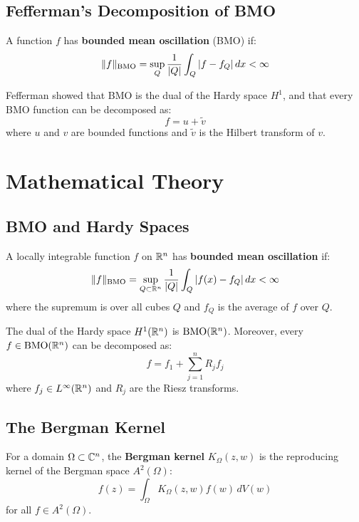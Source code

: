 \subsection{Fefferman's Decomposition of BMO}

A function $f$ has \textbf{bounded mean oscillation} (BMO) if:
\[
\|f\|_{\operatorname{BMO}} = \sup_Q \frac{1}{|Q|} \int_Q |f - f_Q| \, dx < \infty
\]

Fefferman showed that BMO is the dual of the Hardy space $H^1$, and that every BMO function can be decomposed as:
\[
f = u + \widetilde{v}
\]
where $u$ and $v$ are bounded functions and $\widetilde{v}$ is the Hilbert transform of $v$.

\section{Mathematical Theory}

\subsection{BMO and Hardy Spaces}

\begin{definition}[BMO]
A locally integrable function $f$ on $\mathbb{R}^n$ has \textbf{bounded mean oscillation} if:
\[
\|f\|_{\operatorname{BMO}} = \sup_{Q \subset \mathbb{R}^n} \frac{1}{|Q|} \int_Q |f(x) - f_Q| \, dx < \infty
\]
where the supremum is over all cubes $Q$ and $f_Q$ is the average of $f$ over $Q$.
\end{definition}

\begin{theorem}[C.\ Fefferman, 1971]
The dual of the Hardy space $H^1(\mathbb{R}^n)$ is $\operatorname{BMO}(\mathbb{R}^n)$. Moreover, every $f \in \operatorname{BMO}(\mathbb{R}^n)$ can be decomposed as:
\[
f = f_1 + \sum_{j=1}^n R_j f_j
\]
where $f_j \in L^\infty(\mathbb{R}^n)$ and $R_j$ are the Riesz transforms.
\end{theorem}

\subsection{The Bergman Kernel}

\begin{definition}
For a domain $\Omega \subset \mathbb{C}^n$, the \textbf{Bergman kernel} $K_\Omega(z,w)$ is the reproducing kernel of the Bergman space $A^2(\Omega)$:
\[
f(z) = \int_\Omega K_\Omega(z,w) f(w) \, dV(w)
\]
for all $f \in A^2(\Omega)$.
\end{definition}

